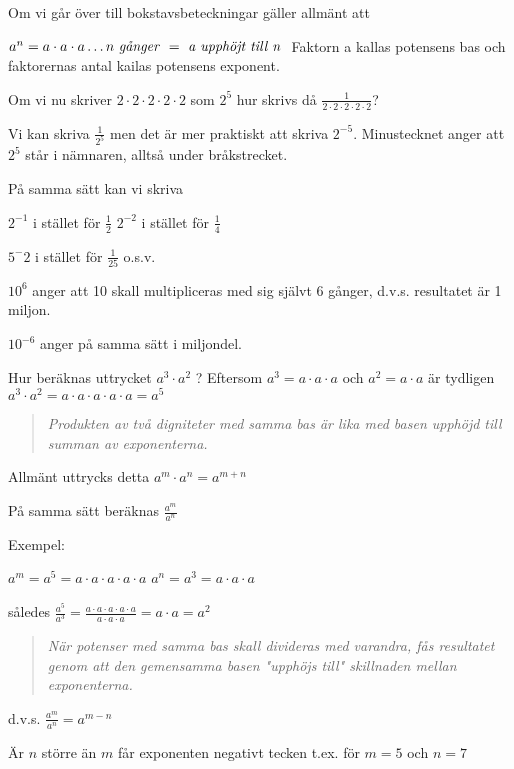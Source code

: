 Om vi går över till bokstavsbeteckningar gäller allmänt att

\(a^n= a \cdot a \cdot a \ldots n \textrm{ \emph{g{\aa}nger} } = \textrm{ \emph{a
  upphöjt till n} }\) 
Faktorn a kallas potensens bas och faktorernas antal kailas potensens exponent.

Om vi nu skriver \(2 \cdot 2 \cdot 2 \cdot 2 \cdot 2\) som \(2^5\) hur skrivs då
\(\frac{1}{2 \cdot 2 \cdot 2 \cdot 2 \cdot 2}\)?

Vi kan skriva \(\frac{1}{2^5}\) men det är mer praktiskt att skriva \(2^{-5}\).
Minustecknet anger att \(2^5\) står i nämnaren, alltså under bråkstrecket.

På samma sätt kan vi skriva

\(2^{-1}\) i stället för \(\frac{1}{2}\) \(2^{-2}\) i stället för \(\frac{1}{4}\)

\(5^-2\) i stället för \(\frac{1}{25}\) o.s.v.

\(10^6\) anger att 10 skall multipliceras med sig självt 6 gånger, d.v.s.
resultatet är 1 miljon.

\(10^{-6}\) anger på samma sätt i miljondel.

Hur beräknas uttrycket \(a^3 \cdot a^2\) ?
Eftersom \(a^3 = a \cdot a \cdot a\) och \(a^2 = a \cdot a\) är tydligen
\(a^3 \cdot a^2 = a \cdot a \cdot a \cdot a \cdot a = a^5\)

\begin{quote}\emph{Produkten av två digniteter med samma bas är lika med basen upphöjd till summan av exponenterna.}\end{quote}

Allmänt uttrycks detta \(a^m \cdot a^n = a^{m+n}\)

På samma sätt beräknas \(\frac{a^m}{a^n}\)

Exempel:

\(a^m = a^5 = a \cdot a \cdot a \cdot a \cdot a\)
\(a^n = a^3 = a \cdot a \cdot a\)

således \(\frac{a^5}{a^3}=\frac{a \cdot a \cdot a \cdot a \cdot a}{a \cdot a \cdot a} = a \cdot a = a^2\)

\begin{quote}\emph{När potenser med samma bas skall divideras med varandra, fås
resultatet genom att den gemensamma basen "upphöjs till" skillnaden mellan
exponenterna.}\end{quote}

d.v.s. \(\frac{a^m}{a^n} = a^{m-n}\)

Är \(n\) större än \(m\) får exponenten negativt tecken t.ex. för \(m = 5\) och \(n = 7\)

